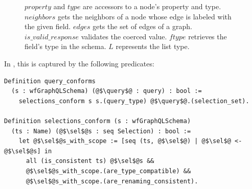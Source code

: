 \begin{figure}[h!]
{{    $\mathit{property}$ and $\mathit{type}$ are accessors to a node's property and type. $\mathit{neighbors}$ gets the neighbors of a node whose edge is labeled with the given field.
    $\mathit{edges}$ gets the set of edges of a graph.  $\mathit{is\_valid\_response}$ validates the coerced value.
    $\mathit{ftype}$ retrieves the field's type in the schema. $L$ represents the list type.}}
    \label{fig:semantics}
\end{figure}


\noindent In \gcoql, this is captured by the following predicates:
\begin{verbatim}
Definition query_conforms 
  (s : wfGraphQLSchema) (@$\query$@ : query) : bool :=
    selections_conform s s.(query_type) @$\query$@.(selection_set).
    
Definition selections_conform (s : wfGraphQLSchema)
  (ts : Name) (@$\sel$@s : seq Selection) : bool :=
    let @$\sel$@s_with_scope := [seq (ts, @$\sel$@) | @$\sel$@ <- @$\sel$@s] in 
      all (is_consistent ts) @$\sel$@s &&
      @$\sel$@s_with_scope.(are_type_compatible) &&
      @$\sel$@s_with_scope.(are_renaming_consistent).
\end{verbatim}

